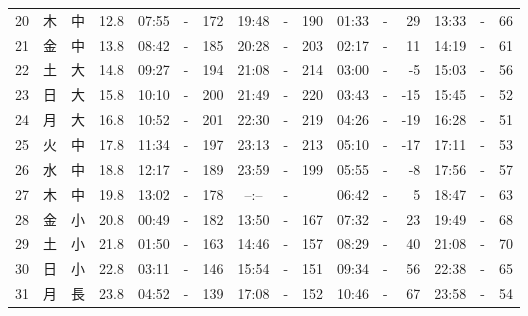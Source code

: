 \documentclass[12pt.a4j]{jsarticle}
\begin{document}
\begin{center}
\begin{table}[ht]
\begin{tabular}{|rc|cr|ccrccr|ccrccr|}
20 & 木 & 中 & 12.8 &  07:55 &-& 172  &  19:48 &-& 190  &   01:33 &-&  29  &   13:33 &-&  66  \\
21 & 金 & 中 & 13.8 &  08:42 &-& 185  &  20:28 &-& 203  &   02:17 &-&  11  &   14:19 &-&  61  \\
22 & 土 & 大 & 14.8 &  09:27 &-& 194  &  21:08 &-& 214  &   03:00 &-&  -5  &   15:03 &-&  56  \\
23 & 日 & 大 & 15.8 &  10:10 &-& 200  &  21:49 &-& 220  &   03:43 &-& -15  &   15:45 &-&  52  \\
24 & 月 & 大 & 16.8 &  10:52 &-& 201  &  22:30 &-& 219  &   04:26 &-& -19  &   16:28 &-&  51  \\
25 & 火 & 中 & 17.8 &  11:34 &-& 197  &  23:13 &-& 213  &   05:10 &-& -17  &   17:11 &-&  53  \\
26 & 水 & 中 & 18.8 &  12:17 &-& 189  &  23:59 &-& 199  &   05:55 &-&  -8  &   17:56 &-&  57  \\
27 & 木 & 中 & 19.8 &  13:02 &-& 178  &  --:-- &-&     &   06:42 &-&   5  &   18:47 &-&  63  \\
28 & 金 & 小 & 20.8 &  00:49 &-& 182  &  13:50 &-& 167  &   07:32 &-&  23  &   19:49 &-&  68  \\
29 & 土 & 小 & 21.8 &  01:50 &-& 163  &  14:46 &-& 157  &   08:29 &-&  40  &   21:08 &-&  70  \\
30 & 日 & 小 & 22.8 &  03:11 &-& 146  &  15:54 &-& 151  &   09:34 &-&  56  &   22:38 &-&  65  \\
31 & 月 & 長 & 23.8 &  04:52 &-& 139  &  17:08 &-& 152  &   10:46 &-&  67  &   23:58 &-&  54  \\
   \hline
   \end{tabular}
\end{table}
\newpage
\end{center}
\end{document}
